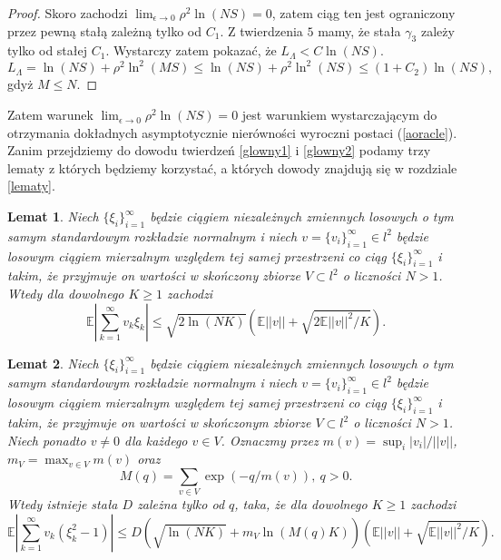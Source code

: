 \documentclass{mwart}
\newtheorem{lm}{Lemat}
\begin{document}
\begin{proof}
Skoro zachodzi $\lim_{\epsilon\to 0}\rho^2\ln(NS)=0$, zatem ciąg ten jest ograniczony przez pewną stałą zależną tylko od $C_1$. Z twierdzenia $5$ mamy, że stała $\gamma_3$ zależy tylko od stałej $C_1$. Wystarczy zatem pokazać, że $L_{\Lambda}<C\ln(NS)$. 
\begin{displaymath}
L_{\Lambda}=\ln(NS)+\rho^2\ln^2(MS)\leq \ln(NS)+\rho^2\ln^2(NS)\leq (1+C_2)\ln(NS),
\end{displaymath}
gdyż $M\leq N$.
\end{proof}
Zatem warunek $\lim_{\epsilon\to 0}\rho^2\ln(NS)=0$ jest warunkiem wystarczającym do otrzymania dokładnych asymptotycznie nierówności wyroczni postaci (\ref{aoracle}).\\
Zanim przejdziemy do dowodu twierdzeń \ref{glowny1} i \ref{glowny2} podamy trzy lematy z których będziemy korzystać, a których dowody znajdują się w rozdziale \ref{lematy}.
\begin{lm}\label{lem1}
Niech $\{\xi_i\}_{i=1}^{\infty}$ będzie ciągiem niezależnych zmiennych losowych o tym samym standardowym rozkładzie normalnym i niech $v=\{v_i\}_{i=1}^{\infty}\in l^2$ będzie losowym ciągiem mierzalnym względem tej samej przestrzeni co ciąg $\{\xi_i\}_{i=1}^{\infty}$ i takim, że przyjmuje on wartości w skończony zbiorze $V\subset l^2$ o liczności $N>1$. Wtedy dla dowolnego $K\geq 1$ zachodzi
\begin{displaymath}
\mathbb{E}\left|\sum_{k=1}^{\infty}v_k\xi_k\right|\leq \sqrt{2\ln (NK)}\left(\mathbb{E}||v||+\sqrt{2\mathbb{E}||v||^2/K}\right).
\end{displaymath}
\end{lm}

\begin{lm}\label{lem2}
Niech $\{\xi_i\}_{i=1}^{\infty}$ będzie ciągiem niezależnych zmiennych losowych o tym samym standardowym rozkładzie normalnym i niech $v=\{v_i\}_{i=1}^{\infty}\in l^2$ będzie losowym ciągiem mierzalnym względem tej samej przestrzeni co ciąg $\{\xi_i\}_{i=1}^{\infty}$ i takim, że przyjmuje on wartości w skończonym zbiorze $V\subset l^2$ o liczności $N>1$. Niech ponadto $v\neq 0$ dla każdego $v\in V$. Oznaczmy przez $m(v)=\sup_i |v_i|/||v||$, $m_V=\max_{v\in V}m(v)$ oraz 
\begin{displaymath}
M(q)=\sum_{v\in V}\exp (-q/m(v)),\ q>0.
\end{displaymath}
Wtedy istnieje stała $D$ zależna tylko od $q$, taka, że dla dowolnego $K\geq 1$ zachodzi
\begin{displaymath}
\mathbb{E}\left|\sum_{k=1}^{\infty}v_k(\xi_k^2-1)\right|\leq D\left(\sqrt{\ln (NK)}+m_V\ln (M(q)K)\right)\left(\mathbb{E}||v||+\sqrt{\mathbb{E}||v||^2/K}\right).
\end{displaymath}
\end{lm}
\end{document}
